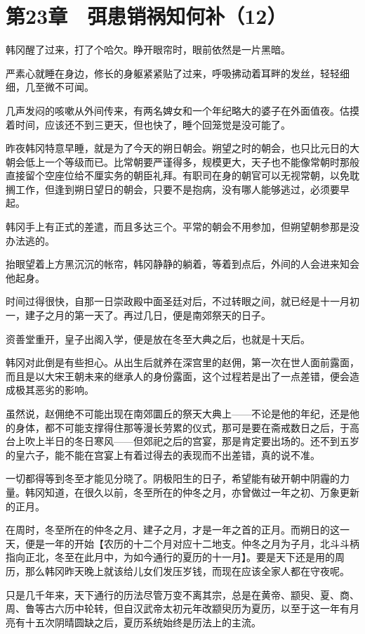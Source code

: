 \section{第23章　弭患销祸知何补（12）}

韩冈醒了过来，打了个哈欠。睁开眼帘时，眼前依然是一片黑暗。

严素心就睡在身边，修长的身躯紧紧贴了过来，呼吸拂动着耳畔的发丝，轻轻细细，几至微不可闻。

几声发闷的咳嗽从外间传来，有两名婢女和一个年纪略大的婆子在外面值夜。估摸着时间，应该还不到三更天，但也快了，睡个回笼觉是没可能了。

昨夜韩冈特意早睡，就是为了今天的朔日朝会。朔望之时的朝会，也只比元日的大朝会低上一个等级而已。比常朝要严谨得多，规模更大，天子也不能像常朝时那般直接留个空座位给不厘实务的朝臣礼拜。有职司在身的朝官可以无视常朝，以免耽搁工作，但逢到朔日望日的朝会，只要不是抱病，没有哪人能够逃过，必须要早起。

韩冈手上有正式的差遣，而且多达三个。平常的朝会不用参加，但朔望朝参那是没办法逃的。

抬眼望着上方黑沉沉的帐帘，韩冈静静的躺着，等着到点后，外间的人会进来知会他起身。

时间过得很快，自那一日崇政殿中面圣廷对后，不过转眼之间，就已经是十一月初一，建子之月的第一天了。再过几日，便是南郊祭天的日子。

资善堂重开，皇子出阁入学，便是放在冬至大典之后，也就是十天后。

韩冈对此倒是有些担心。从出生后就养在深宫里的赵佣，第一次在世人面前露面，而且是以大宋王朝未来的继承人的身份露面，这个过程若是出了一点差错，便会造成极其恶劣的影响。

虽然说，赵佣绝不可能出现在南郊圜丘的祭天大典上——不论是他的年纪，还是他的身体，都不可能支撑得住那等漫长劳累的仪式，那可是要在斋戒数日之后，于高台上吹上半日的冬日寒风——但郊祀之后的宫宴，那是肯定要出场的。还不到五岁的皇六子，能不能在宫宴上有着过得去的表现而不出差错，真的说不准。

一切都得等到冬至才能见分晓了。阴极阳生的日子，希望能有破开朝中阴霾的力量。韩冈知道，在很久以前，冬至所在的仲冬之月，亦曾做过一年之初、万象更新的正月。

在周时，冬至所在的仲冬之月、建子之月，才是一年之首的正月。而朔日的这一天，便是一年的开始【农历的十二个月对应十二地支。仲冬之月为子月，北斗斗柄指向正北，冬至在此月中，为如今通行的夏历的十一月】。要是天下还是用的周历，那么韩冈昨天晚上就该给儿女们发压岁钱，而现在应该全家人都在守夜呢。

只是几千年来，天下通行的历法尽管万变不离其宗，总是在黄帝、颛臾、夏、商、周、鲁等古六历中轮转，但自汉武帝太初元年改颛臾历为夏历，以至于这一年有月亮有十五次阴晴圆缺之后，夏历系统始终是历法上的主流。

